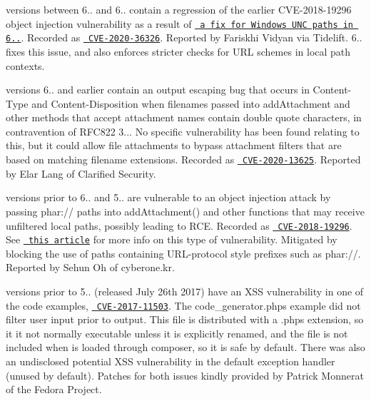  versions between 6.. and 6.. contain a regression of the earlier CVE-\/2018-\/19296 object injection vulnerability as a result of \href{https://github.com/PHPMailer/PHPMailer/commit/e2e07a355ee8ff36aba21d0242c5950c56e4c6f9}{\texttt{ a fix for Windows UNC paths in 6..}}. Recorded as \href{https://web.nvd.nist.gov/view/vuln/detail?vulnId=CVE-2020-36326}{\texttt{ CVE-\/2020-\/36326}}. Reported by Fariskhi Vidyan via Tidelift. 6.. fixes this issue, and also enforces stricter checks for URL schemes in local path contexts.

 versions 6.. and earlier contain an output escaping bug that occurs in {\ttfamily Content-\/\+Type} and {\ttfamily Content-\/\+Disposition} when filenames passed into {\ttfamily add\+Attachment} and other methods that accept attachment names contain double quote characters, in contravention of RFC822 3... No specific vulnerability has been found relating to this, but it could allow file attachments to bypass attachment filters that are based on matching filename extensions. Recorded as \href{https://web.nvd.nist.gov/view/vuln/detail?vulnId=CVE-2020-13625}{\texttt{ CVE-\/2020-\/13625}}. Reported by Elar Lang of Clarified Security.

 versions prior to 6.. and 5.. are vulnerable to an object injection attack by passing {\ttfamily phar\+://} paths into {\ttfamily add\+Attachment()} and other functions that may receive unfiltered local paths, possibly leading to RCE. Recorded as \href{https://web.nvd.nist.gov/view/vuln/detail?vulnId=CVE-2018-19296}{\texttt{ CVE-\/2018-\/19296}}. See \href{https://knasmueller.net/5-answers-about-php-phar-exploitation}{\texttt{ this article}} for more info on this type of vulnerability. Mitigated by blocking the use of paths containing URL-\/protocol style prefixes such as {\ttfamily phar\+://}. Reported by Sehun Oh of cyberone.\+kr.

 versions prior to 5.. (released July 26th 2017) have an XSS vulnerability in one of the code examples, \href{https://web.nvd.nist.gov/view/vuln/detail?vulnId=CVE-2017-11503}{\texttt{ CVE-\/2017-\/11503}}. The {\ttfamily code\+\_\+generator.\+phps} example did not filter user input prior to output. This file is distributed with a {\ttfamily .phps} extension, so it it not normally executable unless it is explicitly renamed, and the file is not included when  is loaded through composer, so it is safe by default. There was also an undisclosed potential XSS vulnerability in the default exception handler (unused by default). Patches for both issues kindly provided by Patrick Monnerat of the Fedora Project.

